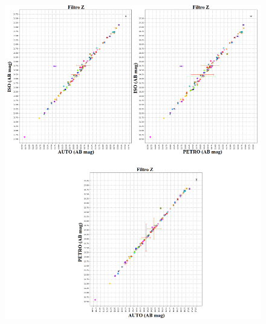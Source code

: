 \begin{anexosenv}
    \begin{figure}[h]
        \centering
        \includegraphics[width=1.0\textwidth]{Imagens/z_iso_auto.png}
        \caption[]{}
        \label{fig:z_iso_auto} 
    \end{figure}


\end{anexosenv}
